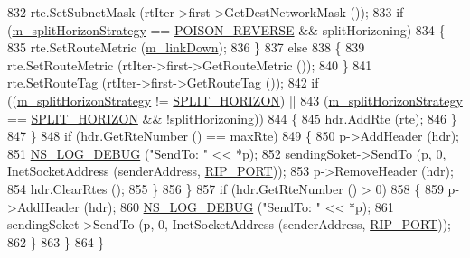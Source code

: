 \begin{DoxyCode}
832                       rte.SetSubnetMask (rtIter->first->GetDestNetworkMask ());
833                       \textcolor{keywordflow}{if} (\hyperlink{classns3_1_1Rip_a2053001529a46356e1f612dfde6b4faf}{m\_splitHorizonStrategy} == 
      \hyperlink{classns3_1_1Rip_aa65e80d926399a90bc81b30dfc9404a4ad6573915007f19810b223a280519eb86}{POISON\_REVERSE} && splitHorizoning)
834                         \{
835                           rte.SetRouteMetric (\hyperlink{classns3_1_1Rip_a3f37d4c5176e380482edf0be82d2fc18}{m\_linkDown});
836                         \}
837                       \textcolor{keywordflow}{else}
838                         \{
839                           rte.SetRouteMetric (rtIter->first->GetRouteMetric ());
840                         \}
841                       rte.SetRouteTag (rtIter->first->GetRouteTag ());
842                       \textcolor{keywordflow}{if} ((\hyperlink{classns3_1_1Rip_a2053001529a46356e1f612dfde6b4faf}{m\_splitHorizonStrategy} != 
      \hyperlink{classns3_1_1Rip_aa65e80d926399a90bc81b30dfc9404a4a37e78b48a284b4248a999e281e8ea5f9}{SPLIT\_HORIZON}) ||
843                           (\hyperlink{classns3_1_1Rip_a2053001529a46356e1f612dfde6b4faf}{m\_splitHorizonStrategy} == 
      \hyperlink{classns3_1_1Rip_aa65e80d926399a90bc81b30dfc9404a4a37e78b48a284b4248a999e281e8ea5f9}{SPLIT\_HORIZON} && !splitHorizoning))
844                         \{
845                           hdr.AddRte (rte);
846                         \}
847                     \}
848                   \textcolor{keywordflow}{if} (hdr.GetRteNumber () == maxRte)
849                     \{
850                       p->AddHeader (hdr);
851                       \hyperlink{group__logging_ga413f1886406d49f59a6a0a89b77b4d0a}{NS\_LOG\_DEBUG} (\textcolor{stringliteral}{"SendTo: "} << *p);
852                       sendingSoket->SendTo (p, 0, InetSocketAddress (senderAddress, 
      \hyperlink{rip_8cc_a6af26a435808c34ee4f8876792a5682a}{RIP\_PORT}));
853                       p->RemoveHeader (hdr);
854                       hdr.ClearRtes ();
855                     \}
856                 \}
857               \textcolor{keywordflow}{if} (hdr.GetRteNumber () > 0)
858                 \{
859                   p->AddHeader (hdr);
860                   \hyperlink{group__logging_ga413f1886406d49f59a6a0a89b77b4d0a}{NS\_LOG\_DEBUG} (\textcolor{stringliteral}{"SendTo: "} << *p);
861                   sendingSoket->SendTo (p, 0, InetSocketAddress (senderAddress, 
      \hyperlink{rip_8cc_a6af26a435808c34ee4f8876792a5682a}{RIP\_PORT}));
862                 \}
863             \}
864         \}

\end{DoxyCode}
